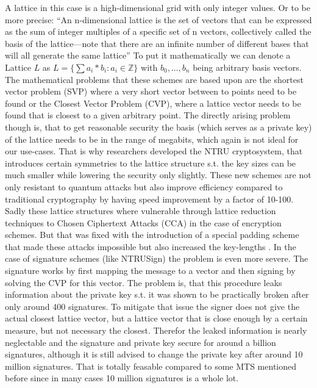 \documentclass[conference]{IEEEtran}
\begin{document}
A lattice in this case is a high-dimensional grid with only integer values. Or to be more precise: ``An n-dimensional lattice is the set of vectors that can be
expressed as the sum of integer multiples of a specific set of n
vectors, collectively called the basis of the lattice—note that
there are an infinite number of different bases that will all
generate the same lattice'' \cite{QR_algs}
To put it mathematically we can denote a Lattice $L$ as $L=\{\sum a_i*b_i : a_i \in \mathbb{Z}\}$ with $b_0,\dots,b_n$ being arbitrary basis vectors.
The mathematical problems that these schemes are based upon are the shortest vector problem (SVP) where a very short vector between to points need to be found or the Closest Vector Problem (CVP), where a lattice vector needs to be found that is closest to a given arbitrary point.
The directly arising problem though is, that to get reasonable security the basis (which serves as a private key) of the lattice needs to be in the range of megabits, which again is not ideal for our use-cases. That is why researchers developed the NTRU cryptosystem, that introduces certain symmetries to the lattice structure s.t. the key sizes can be much smaller while lowering the security only slightly.\cite{QR_algs,QR_comparison}
These new schemes are not only resistant to quantum attacks but also improve efficiency compared to traditional cryptography by having speed improvement by a factor of 10-100.
Sadly these lattice structures where vulnerable through lattice reduction techniques to Chosen Ciphertext Attacks (CCA) in the case of encryption schemes. But that was fixed with the introduction of a special padding scheme that made these attacks impossible but also increased the key-lengths \cite{QR_algs} .
In the case of signature schemes (like NTRUSign) the problem is even more severe.
The signature works by first mapping the message to a vector and then signing by solving the CVP for this vector. The problem is, that this procedure leaks information about the private key s.t. it was shown to be practically broken after only around 400 signatures.  To mitigate that issue the signer does not give the actual closest lattice vector, but a lattice vector that is close enough by a certain measure, but not necessary the closest. Therefor the leaked information is nearly neglectable and the signature and private key secure for around a billion signatures, although it is still advised to change the private key after around 10 million signatures. 
That is totally feasable compared to some MTS mentioned before since in many cases 10 million signatures is a whole lot.\cite{QR_IoT}
\end{document}
